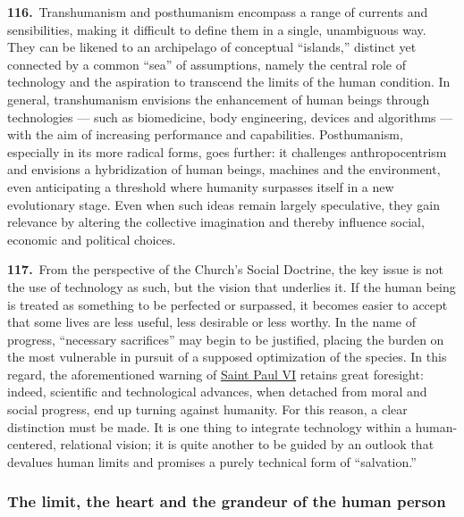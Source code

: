 \documentclass{article}
\begin{document}
\textbf{116.}\ Transhumanism and posthumanism encompass a range of currents and sensibilities, making it difficult to define them in a single, unambiguous way. They can be likened to an archipelago of conceptual ``islands,'' distinct yet connected by a common ``sea'' of assumptions, namely the central role of technology and the aspiration to transcend the limits of the human condition. In general, transhumanism envisions the enhancement of human beings through technologies --- such as biomedicine, body engineering, devices and algorithms --- with the aim of increasing performance and capabilities. Posthumanism, especially in its more radical forms, goes further: it challenges anthropocentrism and envisions a hybridization of human beings, machines and the environment, even anticipating a threshold where humanity surpasses itself in a new evolutionary stage. Even when such ideas remain largely speculative, they gain relevance by altering the collective imagination and thereby influence social, economic and political choices.\cite{n129}

\textbf{117.}\ From the perspective of the Church's Social Doctrine, the key issue is not the use of technology as such, but the vision that underlies it. If the human being is treated as something to be perfected or surpassed, it becomes easier to accept that some lives are less useful, less desirable or less worthy. In the name of progress, ``necessary sacrifices'' may begin to be justified, placing the burden on the most vulnerable in pursuit of a supposed optimization of the species. In this regard, the aforementioned warning of \href{https://www.vatican.va/content/paul-vi/en.html}{Saint Paul VI} retains great foresight: indeed, scientific and technological advances, when detached from moral and social progress, end up turning against humanity.\cite{n130} For this reason, a clear distinction must be made. It is one thing to integrate technology within a human-centered, relational vision; it is quite another to be guided by an outlook that devalues human limits and promises a purely technical form of ``salvation.''

\subsubsection{The limit, the heart and the grandeur of the human person}
\end{document}
